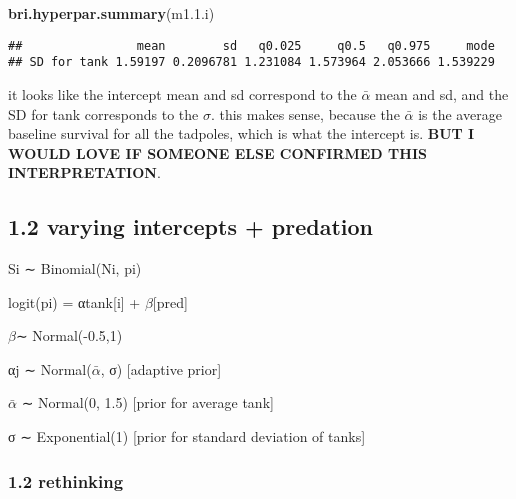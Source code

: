 \documentclass[
]{article}
\newenvironment{Shaded}{\begin{snugshade}}{\end{snugshade}}
\newcommand{\FloatTok}[1]{\textcolor[rgb]{0.00,0.00,0.81}{#1}}
\newcommand{\KeywordTok}[1]{\textcolor[rgb]{0.13,0.29,0.53}{\textbf{#1}}}
\newcommand{\NormalTok}[1]{#1}
\begin{document}
\begin{Shaded}
\begin{Highlighting}[]
\KeywordTok{bri.hyperpar.summary}\NormalTok{(m1.}\FloatTok{1.}\NormalTok{i)}
\end{Highlighting}
\end{Shaded}

\begin{verbatim}
##                mean        sd   q0.025     q0.5   q0.975     mode
## SD for tank 1.59197 0.2096781 1.231084 1.573964 2.053666 1.539229
\end{verbatim}

it looks like the intercept mean and sd correspond to the
\(\bar{\alpha}\) mean and sd, and the SD for tank corresponds to the
\(\sigma\). this makes sense, because the \(\bar{\alpha}\) is the
average baseline survival for all the tadpoles, which is what the
intercept is. \textbf{BUT I WOULD LOVE IF SOMEONE ELSE CONFIRMED THIS
INTERPRETATION}.

\hypertarget{varying-intercepts-predation}{%
\subsection{1.2 varying intercepts +
predation}\label{varying-intercepts-predation}}

Si ∼ Binomial(Ni, pi)

logit(pi) = αtank{[}i{]} + \(\beta\){[}pred{]}

\(\beta\)∼ Normal(-0.5,1)

αj ∼ Normal(\(\bar{\alpha}\), σ) {[}adaptive prior{]}

\(\bar{\alpha}\) ∼ Normal(0, 1.5) {[}prior for average tank{]}

σ ∼ Exponential(1) {[}prior for standard deviation of tanks{]}

\hypertarget{rethinking-1}{%
\subsubsection{1.2 rethinking}\label{rethinking-1}}
\end{document}
